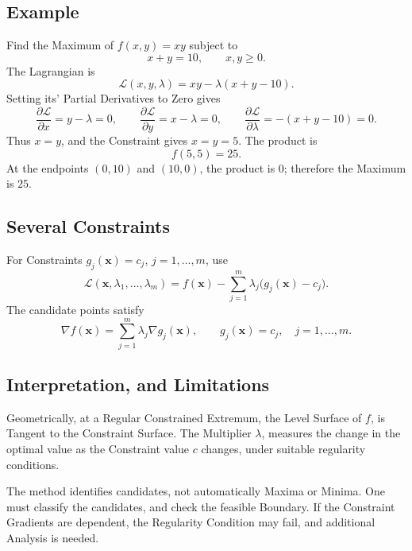 \documentclass[a4paper, 10pt, onepage]{elegantbook}
\begin{document}
\subsection{Example}

Find the Maximum of \(f(x,y)=xy\) subject to
\[
x+y=10,\qquad x,y\geq 0.
\]
The Lagrangian is
\[
\mathcal{L}(x,y,\lambda)=xy-\lambda(x+y-10).
\]
Setting its' Partial Derivatives to Zero gives
\[
\frac{\partial\mathcal{L}}{\partial x}=y-\lambda=0,
\qquad
\frac{\partial\mathcal{L}}{\partial y}=x-\lambda=0,
\qquad
\frac{\partial\mathcal{L}}{\partial\lambda}=-(x+y-10)=0.
\]
Thus \(x=y\), and the Constraint gives \(x=y=5\). The product is
\[
f(5,5)=25.
\]
At the endpoints \((0,10)\) and \((10,0)\), the product is \(0\);
therefore the Maximum is \(25\).

\subsection{Several Constraints}

For Constraints \(g_j(\mathbf{x})=c_j\), \(j=1,\ldots,m\), use
\[
\mathcal{L}(\mathbf{x},\lambda_1,\ldots,\lambda_m)
=f(\mathbf{x})
-\sum_{j=1}^{m}\lambda_j\bigl(g_j(\mathbf{x})-c_j\bigr).
\]
The candidate points satisfy
\[
\nabla f(\mathbf{x})
=\sum_{j=1}^{m}\lambda_j\nabla g_j(\mathbf{x}),
\qquad
g_j(\mathbf{x})=c_j,\quad j=1,\ldots,m.
\]

\subsection{Interpretation, and Limitations}

Geometrically, at a Regular Constrained Extremum, the Level Surface of \(f\), is Tangent to the Constraint Surface. The Multiplier
\(\lambda\), measures the change in the optimal value as the Constraint value \(c\) changes, under suitable regularity conditions.

The method identifies candidates, not automatically Maxima or Minima. One must classify the candidates, and check the feasible Boundary. If the Constraint Gradients are dependent, the Regularity Condition may fail, and additional Analysis is needed.
\end{document}
